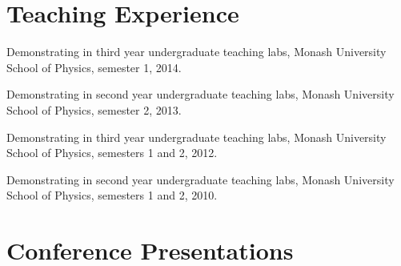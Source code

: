 \documentclass[10pt,letterpaper]{article}
\renewenvironment{itemize}{
  \begin{list}{}{
    \setlength{\leftmargin}{1.5em}
    \setlength{\itemsep}{0.25em}
    \setlength{\parskip}{0pt}
    \setlength{\parsep}{0.25em}
  }
}{
  \end{list}
}
\begin{document}
\section*{Teaching Experience}

\begin{itemize}
\item Demonstrating in third year undergraduate teaching labs, Monash University School of Physics, semester 1, 2014.
\item Demonstrating in second year undergraduate teaching labs, Monash University School of Physics, semester 2, 2013.
\item Demonstrating in third year undergraduate teaching labs, Monash University School of Physics, semesters 1 and 2, 2012.
\item Demonstrating in second year undergraduate teaching labs, Monash University School of Physics, semesters 1 and 2, 2010.
\end{itemize}

\section*{Conference Presentations}
\end{document}
